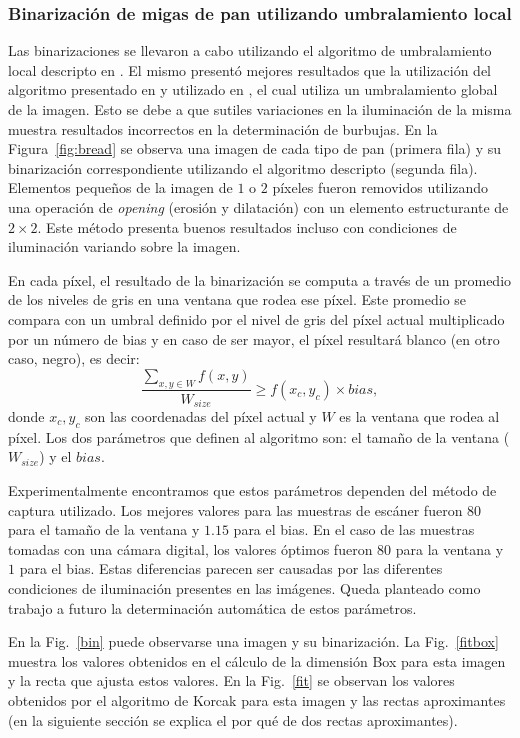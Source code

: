 \subsubsection{Binarización de migas de pan utilizando umbralamiento local}
Las binarizaciones se llevaron a cabo utilizando el algoritmo de umbralamiento local descripto en \cite{White83}. El mismo presentó mejores resultados que la utilización del algoritmo presentado en \cite{Huang95} y utilizado en \cite{Gonzales2008}, el cual utiliza un umbralamiento global de la imagen. Esto se debe a que sutiles variaciones en la iluminación de la misma muestra resultados incorrectos en la determinación de burbujas. En la Figura~\ref{fig:bread} se observa una imagen de cada tipo de pan (primera fila) y su binarización correspondiente utilizando el algoritmo descripto (segunda fila). Elementos pequeños de la imagen de $1$ o $2$ píxeles fueron removidos utilizando una operación de {\em opening} (erosión y dilatación) con un elemento estructurante de $2\times 2$. Este método presenta buenos resultados incluso con condiciones de iluminación variando sobre la imagen.

En cada píxel, el resultado de la binarización se computa a través de un promedio de los niveles de gris en una ventana que rodea ese píxel. Este promedio se compara con un umbral definido por el nivel de gris del píxel actual multiplicado por un número de bias y en caso de ser mayor, el píxel resultará blanco (en otro caso, negro), es decir:
\begin{equation}
\frac{\sum_{x,y \in W} f(x,y) }{W_{size}} \geq f(x_{c},y_{c}) \times bias,
\label{eqn:white}
\end{equation}
donde $x_{c},y_{c}$ son las coordenadas del píxel actual y  $W$ es la ventana que rodea al píxel. Los dos parámetros que definen al algoritmo son: el tamaño de la ventana ($W_{size}$) y el $bias$. 

Experimentalmente encontramos que estos parámetros dependen del método de captura utilizado. Los mejores valores para las muestras de escáner fueron $80$ para el tamaño de la ventana y $1.15 $ para el bias. En el caso de las muestras tomadas con una cámara digital, los valores óptimos fueron $80$ para la ventana y $1$ para el bias.  Estas diferencias parecen ser causadas por las diferentes condiciones de iluminación presentes en las imágenes. Queda planteado como trabajo a futuro la determinación automática de estos parámetros.


En la Fig.~\ref{bin} puede observarse una imagen y su binarizaci\'on.
La Fig.~\ref{fitbox} muestra los valores obtenidos en el c\'alculo de la dimensi\'on Box para esta imagen y la recta que ajusta estos valores. 
En la Fig.~\ref{fit} se observan los valores obtenidos por el algoritmo de Korcak para esta imagen y las rectas aproximantes (en la siguiente secci\'on se explica el por qu\'e de dos rectas aproximantes).

